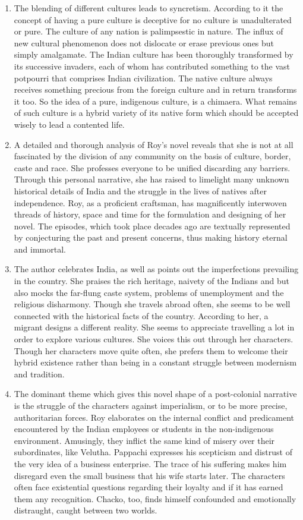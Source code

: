 \begin{enumerate}
  \item The blending of different cultures leads to syncretism.  According to it the concept of having a pure culture is deceptive for no culture is unadulterated or pure.  The culture of any nation is palimpsestic in nature.  The influx of new cultural phenomenon does not dislocate or erase previous ones but simply amalgamate.   The Indian culture has been thoroughly transformed by its successive invaders, each of whom has contributed something to the vast potpourri that comprises Indian civilization.  The native culture always receives something precious from the foreign culture and in return transforms it too.   So the idea of a pure, indigenous culture, is a chimaera. What remains of such culture is a hybrid variety of its native form which should be accepted wisely to lead a contented life.

  \item A detailed and thorough analysis of Roy's novel reveals that she is not at all fascinated by the division of any community on the basis of culture, border, caste and race.  She professes everyone to be unified discarding any barriers.  Through this personal narrative, she has raised to limelight many unknown historical details of India and the struggle in the lives of natives after independence.  Roy, as a proficient craftsman, has magnificently interwoven threads of history, space and time for the formulation and designing of her novel.  The episodes, which took place decades ago are textually represented by conjecturing the past and present concerns, thus making history eternal and immortal.

  \item The author celebrates India, as well as points out the imperfections prevailing in the country.  She praises the rich heritage, naivety of the Indians and but also mocks the far-flung caste system, problems of unemployment and the religious disharmony.  Though she travels abroad often, she seems to be well connected with the historical facts of the country.  According to her, a migrant designs a different reality. She seems to appreciate travelling a lot in order to explore various cultures. She voices this out through her characters. Though her characters move quite often, she prefers them to welcome their hybrid existence rather than being in a constant struggle between modernism and tradition.

  \item The dominant theme which gives this novel shape of a post-colonial narrative is the struggle of the characters against imperialism, or to be more precise, authoritarian forces. Roy elaborates on the internal conflict and predicament encountered by the Indian employees or students in the non-indigenous environment. Amusingly, they inflict the same kind of misery over their subordinates, like Velutha. Pappachi expresses his scepticism and distrust of the very idea of a business enterprise. The trace of his suffering makes him disregard even the small business that his wife starts later. The characters often face existential questions regarding their loyalty and if it has earned them any recognition. Chacko, too, finds himself confounded and emotionally distraught, caught between two worlds.


\end{enumerate}
